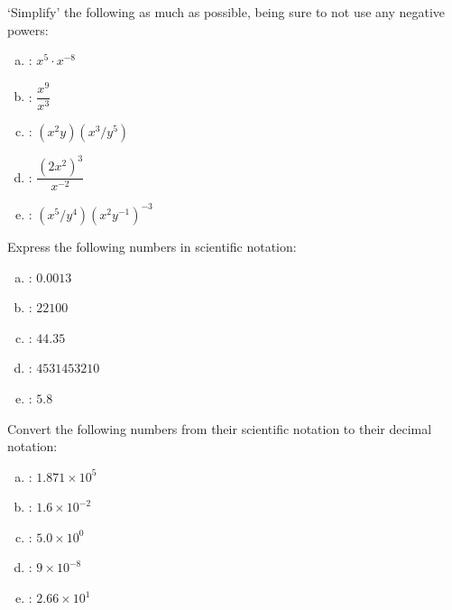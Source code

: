 \documentclass[11pt,letterpaper]{article}
\begin{document}
\vfill
\newpage





 `Simplify' the following as much as possible, being sure to not use any negative powers: \pvspace{0.2cm}
\begin{enumerate}[(a)] \itemsep=2ex
\item {}: \qquad $x^5 \cdot x^{-8}$
\item {}: \qquad $\dfrac{x^9}{x^3}$
\item {}: \qquad $(x^2 y)(x^3/y^5)$
\item {}: \qquad $\dfrac{(2x^2)^3}{x^{-2}}$
\item {}: \qquad $(x^5/y^4)(x^2 y^{-1})^{-3}$
\end{enumerate}





\vfill





 Express the following numbers in scientific notation: \pvspace{0.2cm}
\begin{enumerate}[(a)] \itemsep=2ex
\item {}: \qquad $0.0013$
\item {}: \qquad $22100$
\item {}: \qquad $44.35$
\item {}: \qquad $4531453210$
\item {}: \qquad $5.8$
\end{enumerate}





\vfill





 Convert the following numbers from their scientific notation to their decimal notation: \pvspace{0.2cm}
\begin{enumerate}[(a)] \itemsep=2ex
\item {}: \qquad $1.871 \times 10^5$
\item {}: \qquad $1.6 \times 10^{-2}$
\item {}: \qquad $5.0 \times 10^0$
\item {}: \qquad $9 \times 10^{-8}$
\item {}: \qquad $2.66 \times 10^1$ 
\end{enumerate}


\end{document}
